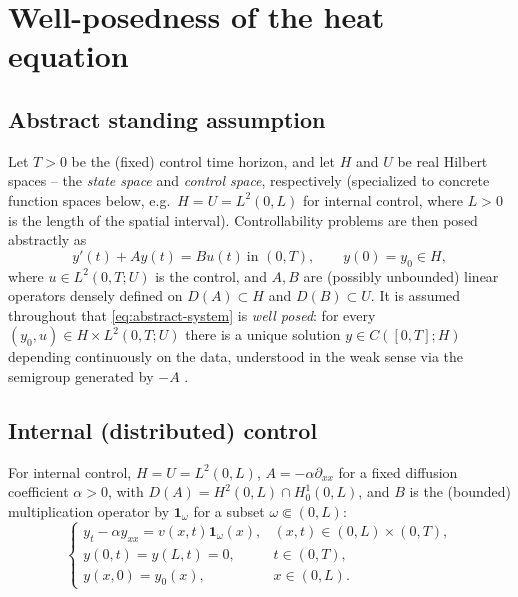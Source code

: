 \section{Well-posedness of the heat equation}
\label{sec:wellposedness}

\subsection*{Abstract standing assumption}

Let $T>0$ be the (fixed) control time horizon, and let $H$ and $U$ be real
Hilbert spaces -- the \emph{state space} and \emph{control space},
respectively (specialized to concrete function spaces below, e.g.\
$H=U=L^2(0,L)$ for internal control, where $L>0$ is the length of the spatial
interval). Controllability problems are then posed abstractly as
\begin{equation}
  \label{eq:abstract-system}
  y'(t) + Ay(t) = Bu(t) \ \text{in } (0,T), \qquad y(0) = y_0 \in H,
\end{equation}
where $u \in L^2(0,T;U)$ is the control, and $A, B$ are (possibly unbounded)
linear operators densely defined on $D(A) \subset H$ and $D(B) \subset U$. It
is assumed throughout that \eqref{eq:abstract-system} is \emph{well posed}: for
every $(y_0, u) \in H \times L^2(0,T;U)$ there is a unique solution
$y \in C([0,T];H)$ depending continuously on the data, understood in the weak
sense via the semigroup generated by $-A$ \citep{pazy2012semigroups}.

\subsection{Internal (distributed) control}
\label{ssec:wp-internal}

For internal control, $H = U = L^2(0,L)$, $A = -\alpha\partial_{xx}$ for a
fixed diffusion coefficient $\alpha>0$, with
$D(A) = H^2(0,L)\cap H^1_0(0,L)$, and $B$ is the (bounded) multiplication
operator by $\mathbf{1}_\omega$ for a subset $\omega \Subset (0,L)$:
\begin{equation}
  \label{eq:heat-internal}
  \begin{cases}
    y_t - \alpha y_{xx} = v(x,t)\mathbf{1}_\omega(x), & (x,t) \in (0,L)\times(0,T),\\
    y(0,t) = y(L,t) = 0, & t \in (0,T),\\
    y(x,0) = y_0(x), & x \in (0,L).
  \end{cases}
\end{equation}

